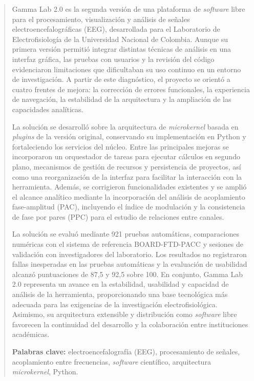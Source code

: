 \documentclass[12pt,letterpaper,oneside]{article}
\begin{document}
\begin{abstract}
Gamma Lab 2.0 es la segunda versión de una plataforma de \textit{software} libre para el procesamiento, visualización y análisis de señales electroencefalográficas (EEG), desarrollada para el Laboratorio de Electrofisiología de la Universidad Nacional de Colombia. Aunque su primera versión permitió integrar distintas técnicas de análisis en una interfaz gráfica, las pruebas con usuarios y la revisión del código evidenciaron limitaciones que dificultaban su uso continuo en un entorno de investigación. A partir de este diagnóstico, el proyecto se orientó a cuatro frentes de mejora: la corrección de errores funcionales, la experiencia de navegación, la estabilidad de la arquitectura y la ampliación de las capacidades analíticas.

La solución se desarrolló sobre la arquitectura de \textit{microkernel} basada en \textit{plugins} de la versión original, conservando su implementación en Python y fortaleciendo los servicios del núcleo. Entre las principales mejoras se incorporaron un orquestador de tareas para ejecutar cálculos en segundo plano, mecanismos de gestión de recursos y persistencia de proyectos, así como una reorganización de la interfaz para facilitar la interacción con la herramienta. Además, se corrigieron funcionalidades existentes y se amplió el alcance analítico mediante la incorporación del análisis de acoplamiento fase-amplitud (PAC), incluyendo el índice de modulación y la consistencia de fase por pares (PPC) para el estudio de relaciones entre canales.

La solución se evaluó mediante 921 pruebas automáticas, comparaciones numéricas con el sistema de referencia BOARD-FTD-PACC y sesiones de validación con investigadores del laboratorio. Los resultados no registraron fallas inesperadas en las pruebas automáticas y la evaluación de usabilidad alcanzó puntuaciones de 87,5 y 92,5 sobre 100. En conjunto, Gamma Lab 2.0 representa un avance en la estabilidad, usabilidad y capacidad de análisis de la herramienta, proporcionando una base tecnológica más adecuada para las exigencias de la investigación electrofisiológica. Asimismo, su arquitectura extensible y distribución como \textit{software} libre favorecen la continuidad del desarrollo y la colaboración entre instituciones académicas.

\textbf{Palabras clave:} electroencefalografía (EEG), procesamiento de señales, acoplamiento entre frecuencias, \textit{software} científico, arquitectura \textit{microkernel}, Python.
\end{abstract}
\end{document}
